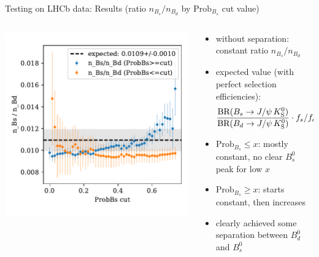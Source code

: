\documentclass[aspectratio=1610, 10pt]{beamer}
\begin{document}
\begin{frame}{Testing on LHCb data: Results (ratio $n_{B_s}/n_{B_d}$ by $\text{Prob}_{B_s}$ cut value)}
  \begin{columns}
    \begin{column}{0.45\textwidth}
      \centering
      \includegraphics[width=\textwidth]{images/ratio_data.pdf}
    \end{column}
    \begin{column}{0.55\textwidth}
      \begin{itemize}
        \item without separation: constant ratio $n_{B_s}/n_{B_d}$
        \item expected value (with perfect selection efficiencies):
        \begin{equation*}
          \frac{\text{BR}(B_s \rightarrow J/\psi \, K^0_\text{S})}{\text{BR}(B_d \rightarrow J/\psi \, K^0_\text{S})} \cdot f_s/f_d(\qty{13}{\TeV}) = \num{0.0109\pm0.0010}
        \end{equation*}
        \pause
        \item $\text{Prob}_{B_s} \leq x$: mostly constant, no clear $B^0_s$ peak for low $x$
        \pause
        \item $\text{Prob}_{B_s} \geq x$: starts constant, then increases
        \pause 
        \item clearly achieved some separation between $B^0_d$ and $B^0_s$
      \end{itemize}
    \end{column}
  \end{columns}
\end{frame}
\end{document}

